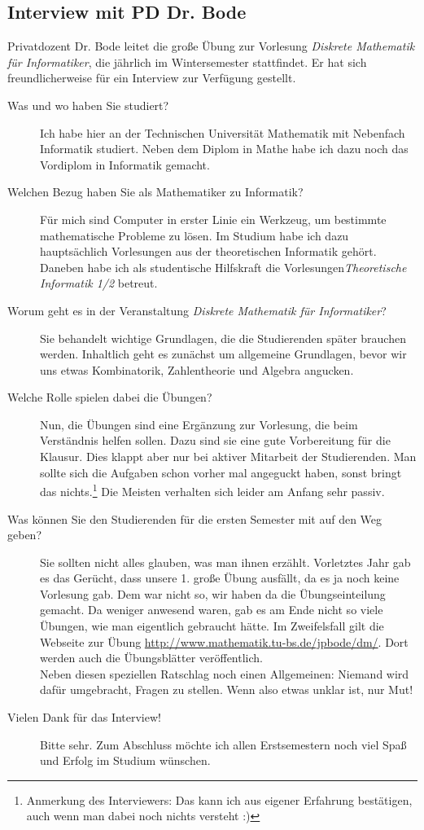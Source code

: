 \subsection{Interview mit PD Dr. Bode}
	Privatdozent Dr. Bode leitet die große Übung zur Vorlesung \emph{Diskrete Mathematik für Informatiker}, die jährlich im Wintersemester stattfindet. Er hat sich freundlicherweise für ein Interview zur Verfügung gestellt.
	\begin{description}
		\item[Was und wo haben Sie studiert?] 

		Ich habe hier an der Technischen Universität Mathematik mit Nebenfach Informatik studiert. Neben dem Diplom in Mathe habe ich dazu noch das Vordiplom in Informatik gemacht.
		\item[Welchen Bezug haben Sie als Mathematiker zu Informatik?] 

		Für mich sind Computer in erster Linie ein Werkzeug, um bestimmte mathematische Probleme zu lösen. Im Studium habe ich dazu hauptsächlich Vorlesungen aus der theoretischen Informatik gehört. Daneben habe ich als studentische Hilfskraft die Vorlesungen\emph{Theoretische Informatik 1/2} betreut.
		\item[Worum geht es in der Veranstaltung \emph{Diskrete Mathematik für Informatiker}?] 

		Sie behandelt wichtige Grundlagen, die die Studierenden später brauchen werden. Inhaltlich geht es zunächst um allgemeine Grundlagen, bevor wir uns etwas Kombinatorik, Zahlentheorie und Algebra angucken.
		\item[Welche Rolle spielen dabei die Übungen?] 

		Nun, die Übungen sind eine Ergänzung zur Vorlesung, die beim Verständnis helfen sollen. Dazu sind sie eine gute Vorbereitung für die Klausur. Dies klappt aber nur bei aktiver Mitarbeit der Studierenden. Man sollte sich die Aufgaben schon vorher mal angeguckt haben, sonst bringt das nichts.\footnote{Anmerkung des Interviewers: Das kann ich aus eigener Erfahrung bestätigen, auch wenn man dabei noch nichts versteht :)} Die Meisten verhalten sich leider am Anfang sehr passiv.
		\item[Was können Sie den Studierenden für die ersten Semester mit auf den Weg geben?] 

		Sie sollten  nicht alles glauben, was man ihnen erzählt. Vorletztes Jahr gab es das Gerücht, dass unsere 1. große Übung ausfällt, da es ja noch keine Vorlesung gab. Dem war nicht so, wir haben da die Übungseinteilung gemacht. Da weniger anwesend waren, gab es am Ende nicht so viele Übungen, wie man eigentlich gebraucht hätte. Im Zweifelsfall gilt die Webseite zur Übung \url{http://www.mathematik.tu-bs.de/jpbode/dm/}. Dort werden auch die Übungsblätter veröffentlich.\\ Neben diesen speziellen Ratschlag noch einen Allgemeinen: Niemand wird dafür umgebracht, Fragen zu stellen. Wenn also etwas unklar ist, nur Mut!
		\item[Vielen Dank für das Interview!] 

		Bitte sehr. Zum Abschluss möchte ich allen Erstsemestern noch viel Spaß und Erfolg im Studium wünschen.
	\end{description}
